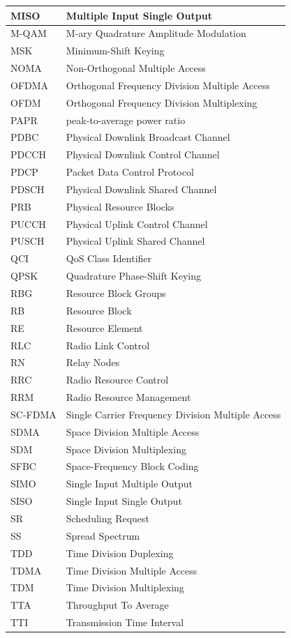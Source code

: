 \documentclass[12pt]{report} %
\begin{document}
{\begin{longtable}{|P{3.0cm}|P{10.0cm}|}
		\hline
		MISO & Multiple Input Single Output \\
		\hline
		M-QAM & M-ary Quadrature Amplitude Modulation \\
		\hline
		MSK & Minimum-Shift Keying \\
		\hline
		NOMA & Non-Orthogonal Multiple Access \\
		\hline
		OFDMA & Orthogonal Frequency Division Multiple Access \\
		\hline
		OFDM & Orthogonal Frequency Division Multiplexing \\
		\hline
		PAPR & peak-to-average power ratio \\
		\hline
		PDBC & Physical Downlink Broadcast Channel \\
		\hline
		PDCCH & Physical Downlink Control Channel \\
		\hline
		PDCP & Packet Data Control Protocol \\
		\hline
		PDSCH & Physical Downlink Shared Channel \\
		\hline
		PRB & Physical Resource Blocks \\
		\hline
		PUCCH & Physical Uplink Control Channel \\
		\hline
		PUSCH & Physical Uplink Shared Channel \\
		\hline
		QCI & QoS Class Identifier \\
		\hline
		QPSK & Quadrature Phase-Shift Keying \\
		\hline
		RBG & Resource Block Groups \\
		\hline
		RB & Resource Block \\
		\hline
		RE & Resource Element \\
		\hline
		RLC & Radio Link Control \\
		\hline
		RN & Relay Nodes \\
		\hline
		RRC & Radio Resource Control \\
		\hline
		RRM & Radio Resource Management \\
		\hline
		SC-FDMA & Single Carrier Frequency Division Multiple Access \\
		\hline
		SDMA & Space Division Multiple Access \\
		\hline
		SDM & Space Division Multiplexing \\
		\hline
		SFBC & Space-Frequency Block Coding \\
		\hline
		SIMO & Single Input Multiple Output \\
		\hline
		SISO & Single Input Single Output \\
		\hline
		SR & Scheduling Request \\
		\hline
		SS & Spread Spectrum \\
		\hline
		TDD & Time Division Duplexing \\
		\hline
		TDMA & Time Division Multiple Access \\
		\hline
		TDM & Time Division Multiplexing \\
		\hline
		TTA & Throughput To Average \\
		\hline
		TTI & Transmission Time Interval \\
		\hline


\end{longtable}}
\end{document}
